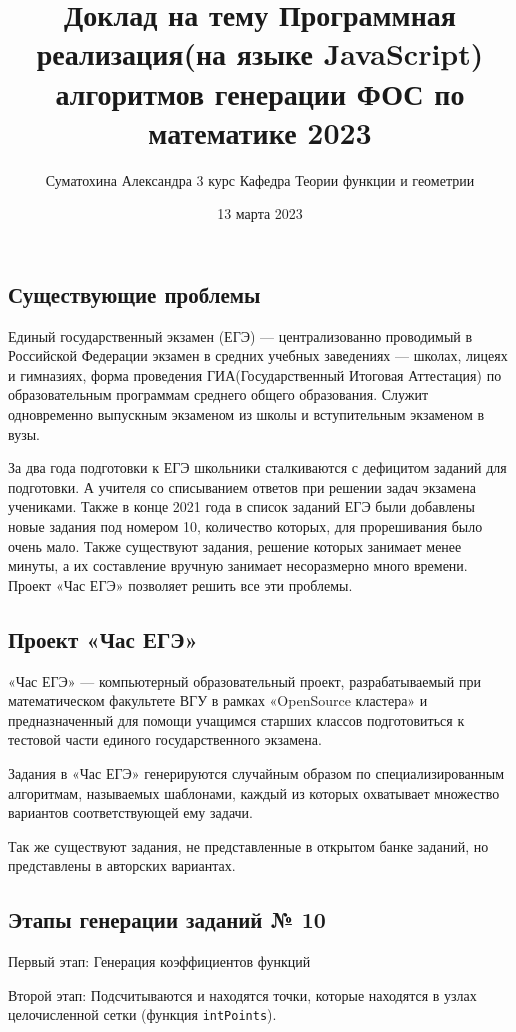 \documentclass[a4paper, 12pt]{extarticle}
\title{Доклад на тему Программная реализация(на языке JavaScript) алгоритмов генерации ФОС по математике 2023}
\author{Суматохина Александра 3 курс Кафедра Теории функции и геометрии}
\date{13 марта 2023}
\begin{document}
    \maketitle
\subsection*{Существующие проблемы}
Единый государственный экзамен (ЕГЭ) — централизованно проводимый в Российской Федерации экзамен в средних учебных заведениях — школах, лицеях и гимназиях, форма проведения ГИА(Государственный Итоговая Аттестация) по образовательным программам среднего общего образования. 
Служит одновременно выпускным экзаменом из школы и вступительным экзаменом в вузы.

За два года подготовки к ЕГЭ школьники сталкиваются с дефицитом заданий для подготовки.
А учителя со списыванием ответов при решении задач экзамена учениками. 
Также в конце 2021 года в список заданий ЕГЭ были добавлены новые задания под номером 10, 
количество которых, для прорешивания было очень мало. 
Также существуют задания, решение которых занимает менее минуты, а их составление вручную занимает несоразмерно много времени. 
Проект «Час ЕГЭ» позволяет решить все эти проблемы.

\subsection*{Проект «Час ЕГЭ»}
«Час ЕГЭ» — компьютерный образовательный проект, разрабатываемый при математическом 
факультете ВГУ в рамках «OpenSource кластера» и предназначенный для помощи учащимся 
старших классов подготовиться к тестовой части единого государственного экзамена.

Задания в «Час ЕГЭ» генерируются случайным образом по специализированным алгоритмам, называемых шаблонами, каждый из которых охватывает множество вариантов соответствующей ему задачи. 

Так же существуют задания, не представленные в открытом банке заданий, но представлены в авторских вариантах.

\subsection*{Этапы генерации заданий № 10}

Первый этап: Генерация коэффициентов функций

Второй этап: Подсчитываются и находятся точки, которые находятся в узлах целочисленной сетки (функция \texttt{intPoints}).
\end{document}
